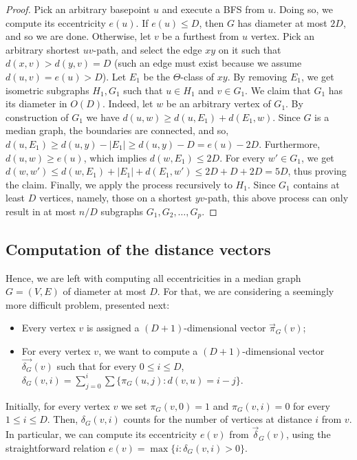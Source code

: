 \documentclass[11pt,letterpaper]{article}
\begin{document}
\begin{proof}
Pick an arbitrary basepoint $u$ and execute a BFS from $u$.
Doing so, we compute its eccentricity $e(u)$.
If $e(u) \le D$, then $G$ has diameter at most $2D$, and so we are done.
Otherwise, let $v$ be a furthest from $u$ vertex.
Pick an arbitrary shortest $uv$-path, and select the edge $xy$ on it such that $d(x,v) > d(y,v) = D$ (such an edge must exist because we assume $d(u,v) = e(u) > D$).
Let $E_1$ be the $\Theta$-class of $xy$.
By removing $E_1$, we get isometric subgraphs $H_1,G_1$ such that $u \in H_1$ and $v \in G_1$.
We claim that $G_1$ has its diameter in ${O}(D)$.
Indeed, let $w$ be an arbitrary vertex of $G_1$. By construction of $G_1$ we have $d(u,w) \ge d(u,E_1) + d(E_1,w)$.
Since $G$ is a median graph, the boundaries are connected, and so, $d(u,E_1) \ge d(u,y) - |E_1| \ge d(u,y) - D = e(u) - 2D$.
Furthermore, $d(u,w) \ge e(u)$, which implies $d(w,E_1) \le 2D$.
For every $w' \in G_1$, we get $d(w,w') \le d(w,E_1) + |E_1| + d(E_1,w') \le 2D + D + 2D = 5D$, thus proving the claim.
Finally, we apply the process recursively to $H_1$.
Since $G_1$ contains at least $D$ vertices, namely, those on a shortest $yv$-path, this above process can only result in at most $n/D$ subgraphs $G_1,G_2,\ldots,G_p$.
\end{proof}

\subsection{Computation of the distance vectors}

Hence, we are left with computing all eccentricities in a median graph $G=(V,E)$ of diameter at most $D$.
For that, we are considering a seemingly more difficult problem, presented next:
\begin{itemize}
    \item Every vertex $v$ is assigned a $(D+1)$-dimensional vector $\overrightarrow{\pi}_G(v)$;
    \item For every vertex $v$, we want to compute a $(D+1)$-dimensional vector $\overrightarrow{\delta_G}(v)$ such that for every $0 \le i \le D$, $\delta_G(v,i) = \sum_{j=0}^i\sum\{ \pi_G(u,j) : d(v,u) = i - j \}$.
\end{itemize}
Initially, for every vertex $v$ we set $\pi_G(v,0) = 1$ and $\pi_G(v,i) = 0$ for every $1 \le i \le D$.
Then, $\delta_G(v,i)$ counts for the number of vertices at distance $i$ from $v$.
In particular, we can compute its eccentricity $e(v)$ from $\overrightarrow{\delta}_G(v)$, using the straightforward relation $e(v) = \max\{ i : \delta_G(v,i) > 0\}$.
\end{document}
